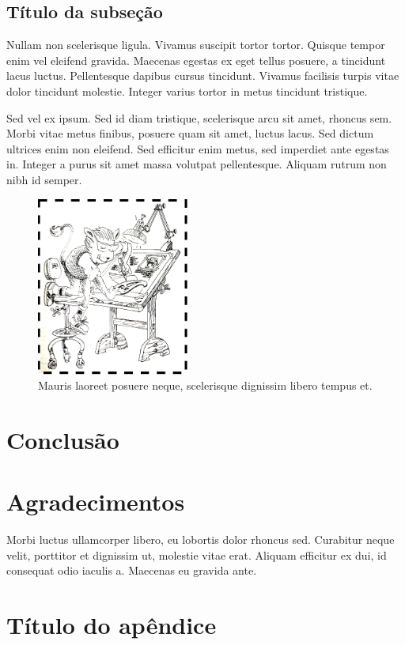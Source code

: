 \documentclass[%
a4paper, %
twocolumn, %
10pt %
]{article}
\begin{document}
\subsection{Título da subseção}
 Nullam non scelerisque ligula. Vivamus suscipit tortor tortor. Quisque tempor enim vel eleifend gravida. Maecenas egestas ex eget tellus posuere, a tincidunt lacus luctus. Pellentesque dapibus cursus tincidunt. Vivamus facilisis turpis vitae dolor tincidunt molestie. Integer varius tortor in metus tincidunt tristique.

Sed vel ex ipsum. Sed id diam tristique, scelerisque arcu sit amet, rhoncus sem. Morbi vitae metus finibus, posuere quam sit amet, luctus lacus. Sed dictum ultrices enim non eleifend. Sed efficitur enim metus, sed imperdiet ante egestas in. Integer a purus sit amet massa volutpat pellentesque. Aliquam rutrum non nibh id semper. 
\begin{figure}[htb]
\centering
\includegraphics[width=5cm]{figura2.eps}
\caption{Mauris laoreet posuere neque, scelerisque dignissim libero tempus et.}
\end{figure}

\section{Conclusão}
\lipsum[2-8]

\section*{Agradecimentos}
Morbi luctus ullamcorper libero, eu lobortis dolor rhoncus sed. Curabitur neque velit, porttitor et dignissim ut, molestie vitae erat. Aliquam efficitur ex dui, id consequat odio iaculis a. Maecenas eu gravida ante.


\appendix
\section{Título do apêndice}
\lipsum[1-2]

%

\end{document}
